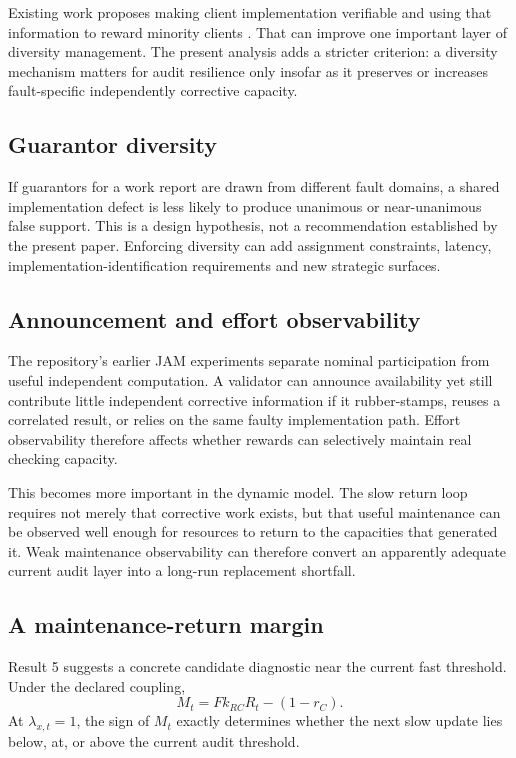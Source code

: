 Existing work proposes making client implementation verifiable and using that information to reward minority clients \citep{ron2026}. That can improve one important layer of diversity management. The present analysis adds a stricter criterion: a diversity mechanism matters for audit resilience only insofar as it preserves or increases fault-specific independently corrective capacity.

\subsection{Guarantor diversity}

If guarantors for a work report are drawn from different fault domains, a shared implementation defect is less likely to produce unanimous or near-unanimous false support. This is a design hypothesis, not a recommendation established by the present paper. Enforcing diversity can add assignment constraints, latency, implementation-identification requirements and new strategic surfaces.

\subsection{Announcement and effort observability}

The repository's earlier JAM experiments separate nominal participation from useful independent computation. A validator can announce availability yet still contribute little independent corrective information if it rubber-stamps, reuses a correlated result, or relies on the same faulty implementation path. Effort observability therefore affects whether rewards can selectively maintain real checking capacity.

This becomes more important in the dynamic model. The slow return loop requires not merely that corrective work exists, but that useful maintenance can be observed well enough for resources to return to the capacities that generated it. Weak maintenance observability can therefore convert an apparently adequate current audit layer into a long-run replacement shortfall.

\subsection{A maintenance-return margin}

Result 5 suggests a concrete candidate diagnostic near the current fast threshold. Under the declared coupling,
\[
M_t=Fk_{RC}R_t-(1-r_C).
\]
At $\lambda_{x,t}=1$, the sign of $M_t$ exactly determines whether the next slow update lies below, at, or above the current audit threshold.

